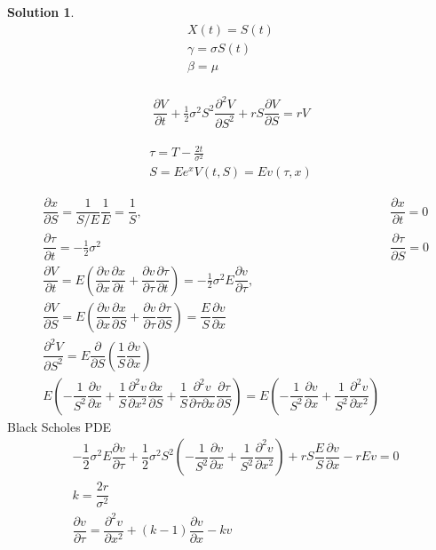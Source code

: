 \documentclass[16pt]{article}
\newtheorem{sol}{Solution}[section]
\begin{document}
\begin{sol}
		\begin{eqnarray*}
			X(t) = S(t)\\
			\gamma = \sigma S(t) \\
			\beta = \mu \\
		\end{eqnarray*}
	
		\begin{eqnarray*}
			\dfrac{\partial V}{\partial t} + \frac{1}{2} \sigma^2 S^2 \dfrac{\partial^2 V}{\partial S^2} + rS \dfrac{\partial V}{\partial S} = rV
		\end{eqnarray*}
	\end{sol}




		\begin{eqnarray*}
			\tau = T - \frac{2t}{\sigma^2} \\
			S = E e^{x}
			V(t,S) = E v(\tau, x)
		\end{eqnarray*}
	
		\begin{eqnarray*}
			&\dfrac{\partial x}{\partial S}  = \dfrac{1}{S/E}  \dfrac{1}{E}  = \dfrac{1}{S},
			   &\dfrac{\partial x}{\partial t}  = 0 \\
			& \dfrac{\partial \tau}{\partial t} = -\frac{1}{2} \sigma^2  &\dfrac{\partial \tau}{\partial S} = 0\\
			&\dfrac{\partial V}{\partial t} = E \left(\dfrac{\partial v}{\partial x }\dfrac{\partial x}{\partial t} + \dfrac{\partial v}{ \partial \tau}\dfrac{\partial \tau}{\partial t}\right) = -\frac{1}{2} \sigma^2 E \dfrac{\partial v}{\partial \tau}, \\
			&\dfrac{\partial V}{\partial S} = E \left(\dfrac{\partial v}{\partial x }\dfrac{\partial x}{\partial S} + \dfrac{\partial v}{ \partial \tau}\dfrac{\partial \tau}{\partial S}\right) = \dfrac{E}{S} \dfrac{\partial v}{\partial x} \\
			&\dfrac{\partial^2 V}{\partial S^2}  = E \dfrac{\partial}{\partial S}\left(\dfrac{1}{S}\dfrac{\partial v}{\partial x}\right) \\
			& E \left(-\dfrac{1}{S^2} \dfrac{\partial v}{\partial x} + \dfrac{1}{S} \dfrac{\partial^2 v}{\partial x^2}\dfrac{\partial x}{\partial S} + \dfrac{1}{S} \dfrac{\partial^2 v}{\partial \tau \partial x} \dfrac{\partial \tau}{\partial S}\right) 
			 = E \left(- \dfrac{1}{S^2} \dfrac{\partial v}{\partial x} + \dfrac{1}{S^2} \dfrac{\partial^2 v}{\partial x^2}\right)
		\end{eqnarray*}
		Black Scholes PDE
		\begin{eqnarray*}
			&-\dfrac{1}{2} \sigma^2 E \dfrac{\partial v}{\partial \tau} + \dfrac{1}{2} \sigma^2 S^2 \left(- \dfrac{1}{S^2} \dfrac{\partial v}{\partial x} + \dfrac{1}{S^2} \dfrac{\partial^2 v}{\partial x^2}\right) + rS \dfrac{E}{S} \dfrac{\partial v}{\partial x} - rEv =0 \\
			&k = \dfrac{2r}{\sigma^2} \\
			& \dfrac{\partial v}{\partial \tau} = \dfrac{\partial^2 v}{\partial x^2} + (k - 1)\dfrac{\partial v}{\partial x} - kv
		\end{eqnarray*}
	
\end{document}
